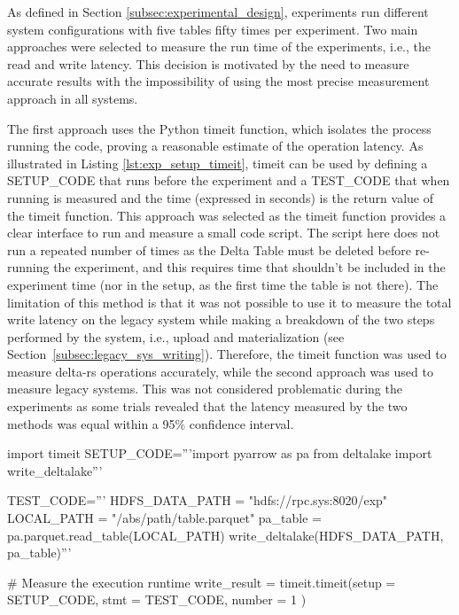 As defined in Section \ref{subsec:experimental_design}, experiments run different system configurations with five tables fifty times per experiment. Two main approaches were selected to measure the run time of the experiments, i.e., the read and write latency. This decision is motivated by the need to measure accurate results with the impossibility of using the most precise measurement approach in all systems.

The first approach uses the Python timeit function, which isolates the process running the code, proving a reasonable estimate of the operation latency. As illustrated in Listing \ref{lst:exp_setup_timeit}, timeit can be used by defining a SETUP\_CODE that runs before the experiment and a TEST\_CODE that when running is measured and the time (expressed in seconds) is the return value of the timeit function. This approach was selected as the timeit function provides a clear interface to run and measure a small code script. The script here does not run a repeated number of times as the Delta Table must be deleted before re-running the experiment, and this requires time that shouldn't be included in the experiment time (nor in the setup, as the first time the table is not there). The limitation of this method is that it was not possible to use it to measure the total write latency on the legacy system while making a breakdown of the two steps performed by the system, i.e., upload and materialization (see Section~\ref{subsec:legacy_sys_writing}). Therefore, the timeit function was used to measure delta-rs operations accurately, while the second approach was used to measure legacy systems. This was not considered problematic during the experiments as some trials revealed that the latency measured by the two methods was equal within a 95\% confidence interval. 
\begin{minipage}{\textwidth}
\begin{python}[caption={[Measuring latency using Timeit]Timeit usage to measure the time required to write a Delta Lake table to \gls{HopsFS}.}, label={lst:exp_setup_timeit}]
import timeit
SETUP_CODE='''import pyarrow as pa
from deltalake import write_deltalake'''
    
TEST_CODE='''
HDFS_DATA_PATH = "hdfs://rpc.sys:8020/exp" 
LOCAL_PATH = "/abs/path/table.parquet"
pa_table = pa.parquet.read_table(LOCAL_PATH)
write_deltalake(HDFS_DATA_PATH, pa_table)'''

# Measure the execution runtime
write_result = timeit.timeit(setup  = SETUP_CODE,
                             stmt   = TEST_CODE,
                             number = 1          )
\end{python}
\end{minipage}
\medskip

